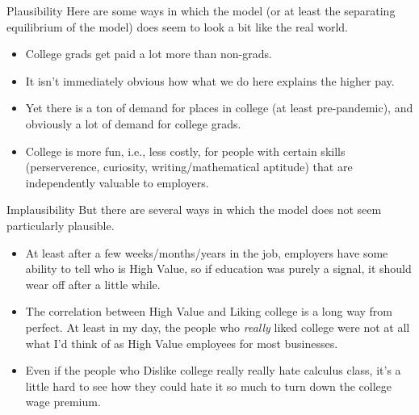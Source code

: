 \documentclass[
  ignorenonframetext,
]{beamer}
\providecommand{\tightlist}{%
  \setlength{\itemsep}{0pt}\setlength{\parskip}{0pt}}
\begin{document}
\begin{frame}{Plausibility}
\protect\hypertarget{plausibility}{}
Here are some ways in which the model (or at least the separating
equilibrium of the model) does seem to look a bit like the real world.

\begin{itemize}
\tightlist
\item
  College grads get paid a lot more than non-grads.
\item
  It isn't immediately obvious how what we do here explains the higher
  pay.
\item
  Yet there is a ton of demand for places in college (at least
  pre-pandemic), and obviously a lot of demand for college grads.
\item
  College is more fun, i.e., less costly, for people with certain skills
  (perserverence, curiosity, writing/mathematical aptitude) that are
  independently valuable to employers.
\end{itemize}
\end{frame}

\begin{frame}{Implausibility}
\protect\hypertarget{implausibility}{}
But there are several ways in which the model does not seem particularly
plausible.

\begin{itemize}
\tightlist
\item
  At least after a few weeks/months/years in the job, employers have
  some ability to tell who is High Value, so if education was purely a
  signal, it should wear off after a little while.
\item
  The correlation between High Value and Liking college is a long way
  from perfect. At least in my day, the people who \emph{really} liked
  college were not at all what I'd think of as High Value employees for
  most businesses.
\item
  Even if the people who Dislike college really really hate calculus
  class, it's a little hard to see how they could hate it so much to
  turn down the college wage premium.
\end{itemize}
\end{frame}
\end{document}
